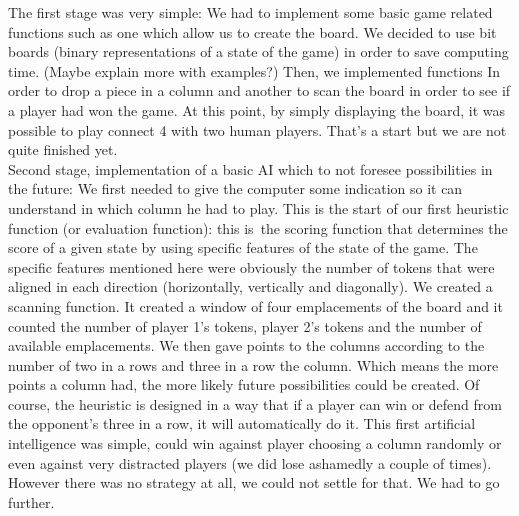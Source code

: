 \documentclass[12pt, a4paper, oneside]{report}
\begin{document}
The first stage was very simple:
 	We had to implement some basic game related functions such as one which allow us to create the board. We decided to use bit boards (binary representations of a state of the game) in order to save computing time. (Maybe explain more with examples?)
	Then, we implemented functions In order to drop a piece in a column and another to scan the board in order to see if a player had won the game. At this point, by simply displaying the board, it was possible to play connect 4 with two human players. That’s a start but we are not quite finished yet. \\
Second stage, implementation of a basic AI which to not foresee possibilities in the future:
	We first needed to give the computer some indication so it can understand in which column he had to play. This is the start of our first heuristic function (or evaluation function): this is the scoring function that determines the score of a given state by using specific features of the state of the game. The specific features mentioned here were obviously the number of tokens that were aligned in each direction (horizontally, vertically and diagonally). We created a scanning function. It created a window of four emplacements of the board and it counted the number of player 1’s tokens, player 2’s tokens and the number of available emplacements. We then gave points to the columns according to the number of two in a rows and three in a row the column. Which means the more points a column had, the more likely future possibilities could be created. Of course, the heuristic is designed in a way that if a player can win or defend from the opponent’s three in a row, it will automatically do it.
	This first artificial intelligence was simple, could win against player choosing a column randomly or even against very distracted players (we did lose ashamedly a couple of times). However there was no strategy at all, we could not settle for that. We had to go further. \\
\end{document}
